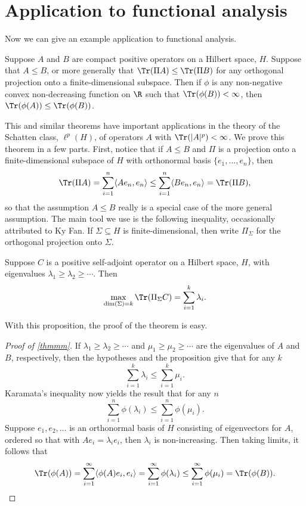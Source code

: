 \documentclass[12pt]{amsart}
\begin{document}
\section{Application to functional analysis}

Now we can give an example application to functional analysis.
\begin{thm}\label{thmmm}Suppose $A$ and $B$ are compact positive operators on a Hilbert space, $H$. Suppose that $A \leq B$, or more generally that $\Tr(\Pi A) \leq \Tr(\Pi B)$ for any orthogonal projection onto a finite-dimensional subspace. Then if $\phi$ is any non-negative convex non-decreasing function on $\R$ such that $\Tr(\phi(B)) < \infty$, then $\Tr(\phi(A)) \leq \Tr(\phi(B))$.\end{thm}
This and similar theorems have important applications in the theory of the Schatten class, $\ell^p(H)$, of operators $A$ with $\Tr(|A|^p) < \infty$.
We prove this theorem in a few parts. First, notice that if $A \leq B$ and $\Pi$ is a projection onto a finite-dimensional subspace of $H$ with orthonormal basis $\{e_1,\ldots,e_n\}$, then
\[\Tr(\Pi A) = \sum_{i=1}^n \langle Ae_n,e_n\rangle \leq \sum_{i=1}^n \langle Be_n,e_n\rangle = \Tr(\Pi B),\] so that the assumption $A \leq B$ really is a special case of the more general assumption.
The main tool we use is the following inequality, occasionally attributed to Ky Fan. If $\Sigma \subseteq H$ is finite-dimensional, then write $\Pi_{\Sigma}$ for the orthogonal projection onto $\Sigma$.
\begin{prop}\label{proppp}Suppose $C$ is a positive self-adjoint operator on a Hilbert space, $H$, with eigenvalues $\lambda_1 \geq \lambda_2 \geq \cdots$. Then
\[\max_{\dim(\Sigma) = k} \Tr(\Pi_\Sigma C) = \sum_{i=1}^k \lambda_i.\]
\end{prop}

With this proposition, the proof of the theorem is easy. 
\begin{proof}[Proof of \cref{thmmm}]If $\lambda_1 \geq \lambda_2 \geq \cdots$ and $\mu_1 \geq \mu_2 \geq \cdots$ are the eigenvalues of $A$ and $B$, respectively, then the hypotheses and the proposition give that for any $k$
\[\sum_{i=1}^k \lambda_i \leq \sum_{i=1}^k \mu_i.\] Karamata's inequality now yields the result that for any $n$
\[\sum_{i=1}^n \phi(\lambda_i) \leq \sum_{i=1}^n \phi(\mu_i).\] Suppose $e_1,e_2,\ldots$ is an orthonormal basis of $H$ consisting of eigenvectors for $A$, ordered so that with $Ae_i = \lambda_ie_i$, then $\lambda_i$ is non-increasing. Then taking limits, it follows that
\[\Tr(\phi(A)) = \sum_{i=1}^{\infty} \langle \phi(A)e_i,e_i\rangle = \sum_{i=1}^\infty \phi(\lambda_i) \leq \sum_{i=1}^{\infty}  \phi(\mu_i) = \Tr(\phi(B)).\]\end{proof}
\end{document}
